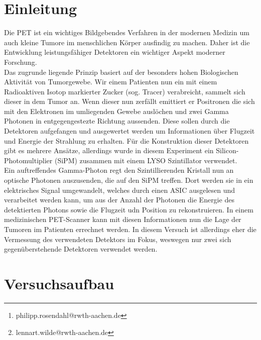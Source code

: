 \documentclass[12pt,twoside,a4paper]{scrartcl}
\author{Philipp Rosendahl Mat.-Nr: 378029\thanks{philipp.rosendahl@rwth-aachen.de}
		\and Lennart Wilde, Mat.-Nr: 381588\thanks{lennart.wilde@rwth-aachen.de}}
\begin{document}
\maketitle
\newpage

\tableofcontents
\newpage


\section{Einleitung}

	Die PET ist ein wichtiges Bildgebendes Verfahren in der modernen Medizin um auch kleine Tumore im menschlichen Körper ausfindig zu machen. Daher ist die Entwicklung leistungsfähiger Detektoren ein wichtiger Aspekt moderner Forschung. \\

	Das zugrunde liegende Prinzip basiert auf der besonders hohen Biologischen Aktivität von Tumorgewebe. Wir einem Patienten nun ein mit einem Radioaktiven Isotop markierter Zucker (sog. Tracer) verabreicht, sammelt sich dieser in dem Tumor an. Wenn dieser nun zerfällt emittiert er Positronen die sich mit den Elektronen im umliegenden Gewebe auslöchen und zwei Gamma Photonen in entgegengestezte Richtung aussenden. Diese sollen durch die Detektoren aufgefangen und ausgewertet werden um Informationen über Flugzeit und Energie der Strahlung zu erhalten. Für die Konstruktion dieser Detektoren gibt es mehrere Ansätze, allerdings wurde in diesem Experiment ein Silicon-Photomultiplier (SiPM) zusammen mit einem LYSO Szintillator verwendet.\\

	Ein auftreffendes Gamma-Photon regt den Szintillierenden Kristall nun an optische Photonen auszusenden, die auf den SiPM treffen. Dort werden sie in ein elektrisches Signal umgewandelt, welches durch einen ASIC ausgelesen und verarbeitet werden kann, um aus der Anzahl der Photonen die Energie des detektierten Photons sowie die Flugzeit udn Position zu rekonstruieren. In einem medizinischen PET-Scanner kann mit diesen Informationen nun die Lage der Tumoren im Patienten errechnet werden. In diesem Versuch ist allerdings eher die Vermessung des verwendeten Detektors im Fokus, weswegen nur zwei sich gegenüberstehende Detektoren verwendet werden.

	\newpage

\section{Versuchsaufbau}
\end{document}
